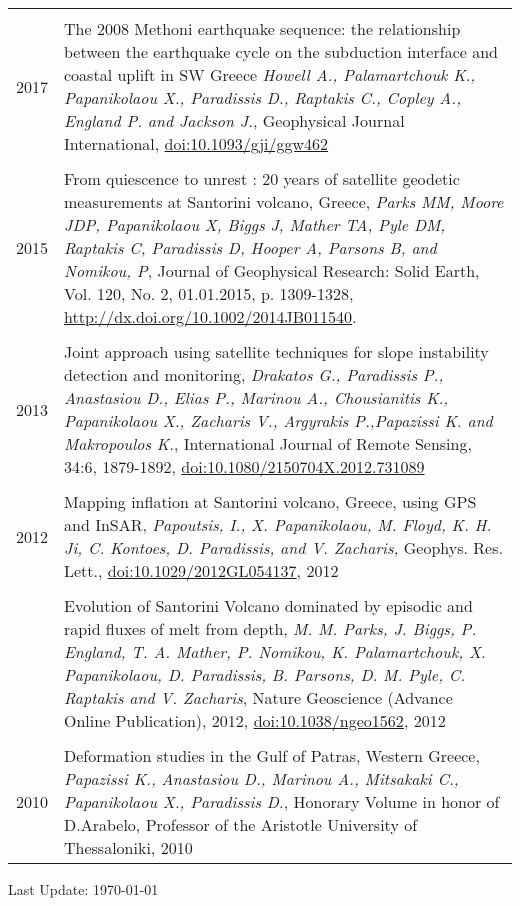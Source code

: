 \documentclass[8pt]{extarticle} %
\begin{document}
\begin{longtable}{r|p{18cm}}
\multicolumn{2}{c}{} \\
  \textsc{2017}
%
  & The 2008 Methoni earthquake sequence: the relationship between the earthquake cycle on the subduction interface and coastal uplift in SW Greece
  \emph{Howell A., Palamartchouk K., Papanikolaou X., Paradissis D., Raptakis C., Copley A., England P. and Jackson J.}, Geophysical Journal International, \href{https://doi.org/10.1093/gji/ggw462}{doi:10.1093/gji/ggw462}\\
%
\multicolumn{2}{c}{} \\
  \textsc{2015}
%
  & From quiescence to unrest : 20 years of satellite geodetic measurements at Santorini volcano, Greece,
  \emph{Parks MM, Moore JDP, Papanikolaou X, Biggs J, Mather TA, Pyle DM, Raptakis C, Paradissis D, Hooper A, Parsons B, and Nomikou, P}, Journal of Geophysical Research: Solid Earth, Vol. 120, No. 2, 01.01.2015, p. 1309-1328, \href{http://dx.doi.org/10.1002/2014JB011540}{http://dx.doi.org/10.1002/2014JB011540}.\\
%  
\multicolumn{2}{c}{} \\ 
  \textsc{2013}
%
  & Joint approach using satellite techniques for slope instability detection and monitoring,
  \emph{Drakatos G., Paradissis P., Anastasiou D., Elias P., Marinou A., Chousianitis K., Papanikolaou X., Zacharis V., Argyrakis P.,Papazissi K. and Makropoulos K.},
  International Journal of Remote Sensing, 34:6, 1879-1892, \href{http://www.tandfonline.com/doi/abs/10.1080/2150704X.2012.731089#.Uxni9meIaig}{doi:10.1080/2150704X.2012.731089}\\
%
\multicolumn{2}{c}{} \\ 
  \textsc{2012}
  & Mapping inflation at Santorini volcano, Greece, using GPS and InSAR,
  \emph{Papoutsis, I., X. Papanikolaou, M. Floyd, K. H. Ji, C. Kontoes, D. Paradissis, and V. Zacharis,}
  Geophys. Res. Lett., \href{http://www.agu.org/pubs/crossref/pip/2012GL054137.shtml}{doi:10.1029/2012GL054137}, 2012\\
%
  &\\
%
  & Evolution of Santorini Volcano dominated by episodic and rapid fluxes of melt from depth,
  \emph{M. M. Parks, J. Biggs, P. England, T. A. Mather, P. Nomikou, K. Palamartchouk, X. Papanikolaou, D. Paradissis, B. Parsons, D. M. Pyle, C. Raptakis and V. Zacharis},
  Nature Geoscience (Advance Online Publication), 2012, \href{http://www.nature.com/ngeo/journal/v5/n10/full/ngeo1562.html}{doi:10.1038/ngeo1562}, 2012\\
%
\multicolumn{2}{c}{} \\ 
  \textsc{2010}
  & Deformation studies in the Gulf of Patras, Western Greece,
  \emph{Papazissi K., Anastasiou D., Marinou A., Mitsakaki C., Papanikolaou X., Paradissis D.}, 
  Honorary Volume in honor of D.Arabelo, Professor of the Aristotle University of Thessaloniki, 2010\\
\end{longtable}

\vfill
\begin{center}
  \begin{footnotesize}
    Last Update: \today
  \end{footnotesize}
\end{center}
\end{document}
